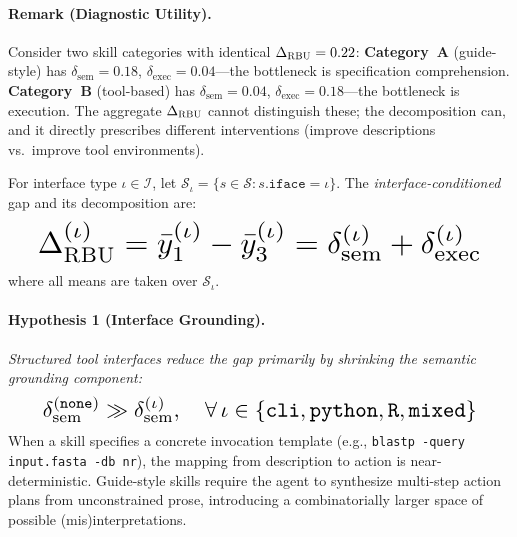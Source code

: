 \paragraph{Remark (Diagnostic Utility).}
Consider two skill categories with identical $\Delta_{\textsc{RBU}} = 0.22$: \textbf{Category~A} (guide-style) has $\delta_{\text{sem}} = 0.18$, $\delta_{\text{exec}} = 0.04$---the bottleneck is specification comprehension.
\textbf{Category~B} (tool-based) has $\delta_{\text{sem}} = 0.04$, $\delta_{\text{exec}} = 0.18$---the bottleneck is execution.
The aggregate $\Delta_{\textsc{RBU}}$ cannot distinguish these; the decomposition can, and it directly prescribes different interventions (improve descriptions vs.\ improve tool environments).

For interface type $\iota \in \mathcal{I}$, let $\mathcal{S}_\iota = \{s \in \mathcal{S} : s.\texttt{iface} = \iota\}$.
The \emph{interface-conditioned} \rbu gap and its decomposition are:
\begin{equation}
    \resizebox{0.92\columnwidth}{!}{$\displaystyle
        \Delta_{\textsc{RBU}}^{(\iota)} = \bar{y}_1^{(\iota)} - \bar{y}_3^{(\iota)}
        = \delta_{\text{sem}}^{(\iota)} + \delta_{\text{exec}}^{(\iota)}
    $}
    \label{eq:conditioned_rbu}
\end{equation}
where all means are taken over $\mathcal{S}_\iota$.

\paragraph{Hypothesis 1 (Interface Grounding).}
\emph{Structured tool interfaces reduce the \rbu gap primarily by shrinking the semantic grounding component:}
\begin{equation}
    \resizebox{0.90\columnwidth}{!}{$\displaystyle
        \delta_{\text{sem}}^{(\texttt{none})} \gg \delta_{\text{sem}}^{(\iota)}, \quad
        \forall\, \iota \in \{\texttt{cli}, \texttt{python}, \texttt{R}, \texttt{mixed}\}
    $}
    \label{eq:interface_hyp}
\end{equation}
When a skill specifies a concrete invocation template (e.g., \texttt{blastp -query input.fasta -db nr}), the mapping from description to action is near-deterministic.
Guide-style skills require the agent to synthesize multi-step action plans from unconstrained prose, introducing a combinatorially larger space of possible (mis)interpretations.


